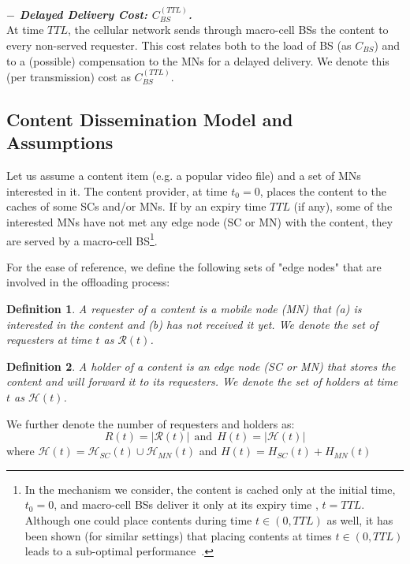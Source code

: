 \documentclass[10pt,conference,letterpaper]{IEEEtran}
\newtheorem{definition}{Definition}
\begin{document}
\noindent \textbf{\textit{$-$ Delayed Delivery Cost: $ C_{BS}^{(TTL)}$.}}\\
At time $TTL$, the cellular network sends through macro-cell BSs the content to every non-served requester. This cost relates both to the load of BS (as $C_{BS}$) and to a (possible) compensation to the MNs for a delayed delivery. We denote this (per transmission) cost as $C_{BS}^{(TTL)}$.


\subsection{Content Dissemination Model and Assumptions}\label{sec:analysis-preliminaries}
Let us assume a content item (e.g. a popular video file) and a set of MNs interested in it. The content provider, at time $t_{0}=0$, places the content to the caches of some SCs and/or MNs. If by an expiry time $TTL$ (if any), some of the interested MNs have not met any edge node (SC or MN) with the content, they are served by a macro-cell BS\footnote{In the mechanism we consider, the content is cached only at the initial time, $t_{0}=0$, and macro-cell BSs deliver it only at its expiry time , $t=TTL$. Although one could place contents during time $t\in(0,TTL)$ as well, it has been shown (for similar settings) that placing contents at times $t\in(0,TTL)$ leads to a sub-optimal performance~\cite{offloading-control-theory,fluid-limit-mass2012}.}.

For the ease of reference, we define the following sets of "edge nodes" that are involved in the offloading process: 
\begin{definition}
A \emph{requester} of a content is a mobile node (MN) that (a) is interested in the content and (b) has not received it yet. We denote the set of requesters at time $t$ as $\mathcal{R}(t)$.
\end{definition}
\begin{definition}
A \emph{holder} of a content is an edge node (SC or MN) that stores the content and will forward it to its requesters. We denote the set of holders at time $t$ as $\mathcal{H}(t)$.
\end{definition}
\noindent We further denote the number of requesters and holders as:
\begin{equation*}
R(t) = |\mathcal{R}(t)|~~\text{and}~~H(t) = |\mathcal{H}(t)|
\end{equation*}
where $\mathcal{H}(t) = \mathcal{H}_{SC}(t)\cup\mathcal{H}_{MN}(t)$ and $H(t) = H_{SC}(t)+H_{MN}(t)$
\end{document}
